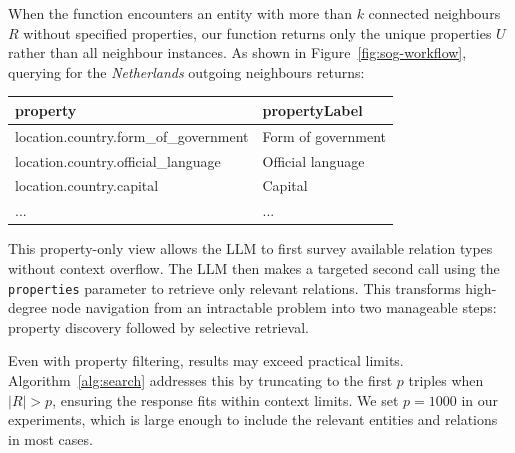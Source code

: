 \documentclass[sigconf]{acmart}
\begin{document}
When the function encounters an entity with more than $k$ connected neighbours $R$ without specified properties, our function returns only the unique properties $U$ rather than all neighbour instances. As shown in Figure~\ref{fig:sog-workflow}, querying for the \textit{Netherlands} outgoing neighbours returns:
\begin{functionoutput2}
\begin{tabular}{l|l}
property & propertyLabel \\
\hline
location.country.form\_of\_government & Form of government \\
location.country.official\_language & Official language \\
location.country.capital & Capital \\
... & ...
\end{tabular}
\end{functionoutput2}

This property-only view allows the LLM to first survey available relation types without context overflow. The LLM then makes a targeted second call using the \texttt{properties} parameter to retrieve only relevant relations. This transforms high-degree node navigation from an intractable problem into two manageable steps: property discovery followed by selective retrieval. 

Even with property filtering, results may exceed practical limits. Algorithm~\ref{alg:search} addresses this by truncating to the first $p$ triples when $|R|>p$, ensuring the response fits within context limits. We set $p=1000$ in our experiments, which is large enough to include the relevant entities and relations in most cases.

\end{document}
